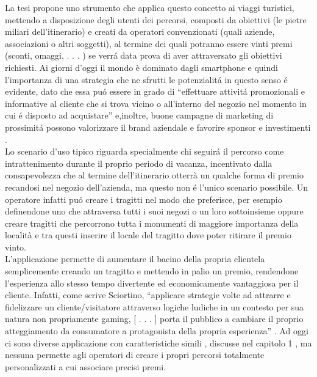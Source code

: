 La tesi propone uno strumento che applica questo concetto ai
viaggi turistici, mettendo a disposizione degli utenti dei percorsi, composti da obiettivi (le pietre miliari dell’itinerario) e creati da operatori convenzionati (quali aziende, associazioni o altri soggetti), al termine dei quali potranno essere vinti premi (sconti, omaggi, . . . ) se verrá data prova di aver attraversato gli obiettivi richiesti.
Ai giorni d'oggi il mondo è dominato dagli smartphone e quindi l'importanza di una strategia che ne sfrutti le potenzialitá in questo senso é evidente, dato che essa puó essere in grado di “effettuare attivitá promozionali e informative al cliente che si trova vicino o all’interno del negozio nel momento in cui é disposto ad acquistare” \cite{rif1} e,inoltre, buone campagne di marketing di prossimitá possono valorizzare il brand aziendale e favorire sponsor e investimenti \cite{rif4}.\\[0.2cm]

Lo scenario d'uso tipico riguarda specialmente chi seguirá il percorso come intrattenimento durante il proprio periodo di vacanza, incentivato dalla consapevolezza che al termine dell’itinerario otterrà un qualche forma di premio recandosi nel negozio dell'azienda, ma questo non é l’unico scenario possibile. Un operatore infatti puó creare i tragitti nel modo che preferisce, per esempio definendone uno che attraversa tutti i suoi negozi o un loro sottoinsieme oppure creare tragitti che percorrono tutta i monumenti di maggiore importanza della località e tra questi inserire il locale del tragitto dove poter ritirare il premio vinto.\\[0.2cm]

L'applicazione permette di aumentare il bacino della propria clientela semplicemente creando un tragitto e mettendo in palio un premio, rendendone l'esperienza allo stesso tempo divertente ed economicamente vantaggiosa per il cliente. Infatti, come scrive Sciortino, “applicare strategie volte ad attrarre e fidelizzare un cliente/visitatore attraverso logiche ludiche in un contesto per sua natura non propriamente gaming, [ . . . ] porta il pubblico a cambiare il proprio atteggiamento da consumatore a protagonista della propria esperienza” \cite{rif5}.
Ad oggi ci sono diverse applicazione con caratteristiche simili , discusse nel capitolo 1 , ma nessuna permette agli operatori di creare i propri percorsi totalmente personalizzati a cui associare precisi premi.

\renewcommand*\contentsname{Indice}
\tableofcontents

